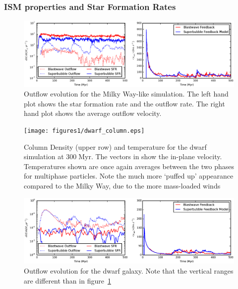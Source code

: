 \subsubsection{ISM properties and Star Formation Rates}\label{ISM1}
\begin{figure}
    \includegraphics[width=\textwidth]{figures1/milkyway_outflow.eps}
    \caption[Outflow evolution in isolated Milky Way]{Outflow evolution for the
    Milky Way-like simulation.  The left hand plot shows the star formation rate
    and the outflow rate. The right hand plot shows the average outflow
    velocity.}
    \label{milkyway_outflow1}
\end{figure}

\begin{figure}
    \texttt{[image: figures1/dwarf\_column.eps]}
    \caption[Column density and temperature images of isolated dwarf]{Column
    Density (upper row) and temperature for the dwarf simulation at
    $300\;\mathrm{Myr}$.  The vectors in show the in-plane velocity.
    Temperatures shown are once again averages between the two phases for
    multiphase particles.  Note the much more `puffed up' appearance compared to
    the Milky Way, due to the more mass-loaded winds}
    \label{dwarf_column1}
\end{figure}

\begin{figure}
    \includegraphics[width=\textwidth]{figures1/dwarf_outflow.eps}
    \caption[Outflow evolution in isolated dwarf]{Outflow evolution for the
    dwarf galaxy.  Note that the vertical ranges are different than in
    figure~\ref{milkyway_outflow1}}
    \label{dwarf_outflow1}
\end{figure}

